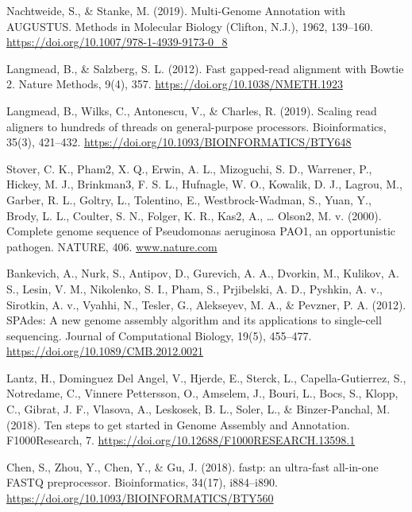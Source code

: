 \documentclass[journal, letterpaper, 11pt]{IEEEtran}
\begin{document}
\begin{thebibliography}{7}

Nachtweide, S., \& Stanke, M. (2019). Multi-Genome Annotation with AUGUSTUS. Methods in Molecular Biology (Clifton, N.J.), 1962, 139–160.  \url{ https://doi.org/10.1007/978-1-4939-9173-0_8}

Langmead, B., \& Salzberg, S. L. (2012). Fast gapped-read alignment with Bowtie 2. Nature Methods, 9(4), 357.  \url{ https://doi.org/10.1038/NMETH.1923}

Langmead, B., Wilks, C., Antonescu, V., \& Charles, R. (2019). Scaling read aligners to hundreds of threads on general-purpose processors. Bioinformatics, 35(3), 421–432.  \url{ https://doi.org/10.1093/BIOINFORMATICS/BTY648}

Stover, C. K., Pham2, X. Q., Erwin, A. L., Mizoguchi, S. D., Warrener, P., Hickey, M. J., Brinkman3, F. S. L., Hufnagle, W. O., Kowalik, D. J., Lagrou, M., Garber, R. L., Goltry, L., Tolentino, E., Westbrock-Wadman, S., Yuan, Y., Brody, L. L., Coulter, S. N., Folger, K. R., Kas2, A., … Olson2, M. v. (2000). Complete genome sequence of Pseudomonas aeruginosa PAO1, an opportunistic pathogen. NATURE, 406.  \url{www.nature.com}

Bankevich, A., Nurk, S., Antipov, D., Gurevich, A. A., Dvorkin, M., Kulikov, A. S., Lesin, V. M., Nikolenko, S. I., Pham, S., Prjibelski, A. D., Pyshkin, A. v., Sirotkin, A. v., Vyahhi, N., Tesler, G., Alekseyev, M. A., \& Pevzner, P. A. (2012). SPAdes: A new genome assembly algorithm and its applications to single-cell sequencing. Journal of Computational Biology, 19(5), 455–477.  \url{https://doi.org/10.1089/CMB.2012.0021}

Lantz, H., Dominguez Del Angel, V., Hjerde, E., Sterck, L., Capella-Gutierrez, S., Notredame, C., Vinnere Pettersson, O., Amselem, J., Bouri, L., Bocs, S., Klopp, C., Gibrat, J. F., Vlasova, A., Leskosek, B. L., Soler, L., \& Binzer-Panchal, M. (2018). Ten steps to get started in Genome Assembly and Annotation. F1000Research, 7. \url{https://doi.org/10.12688/F1000RESEARCH.13598.1}

Chen, S., Zhou, Y., Chen, Y., \& Gu, J. (2018). fastp: an ultra-fast all-in-one FASTQ preprocessor. Bioinformatics, 34(17), i884–i890.  \url{https://doi.org/10.1093/BIOINFORMATICS/BTY560}


\end{thebibliography}
\end{document}
